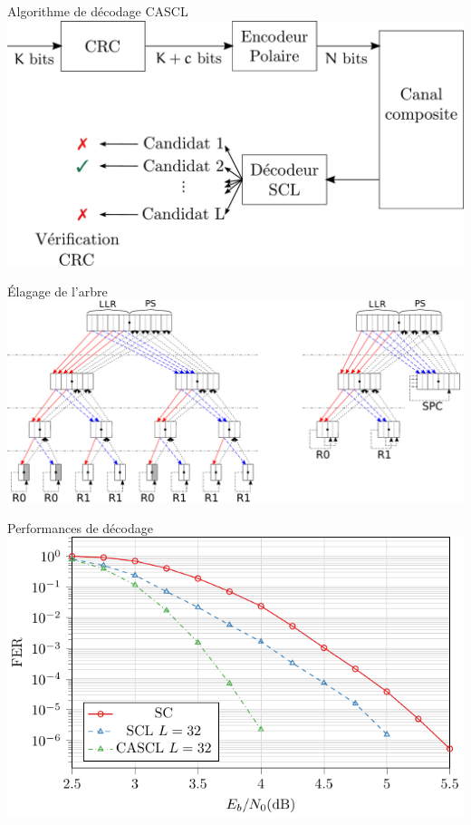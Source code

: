 \documentclass[t,compress,mathserif,12pt,xcolor=dvipsnames]{beamer}
\begin{document}
\begin{frame}[c]{Algorithme de décodage CASCL}
			\includegraphics[width=\textwidth]{./fig/cascl}
\end{frame}

\begin{frame}[c]{\'Elagage de l'arbre}
			\includegraphics[width=\textwidth]{./fig/pruning}
\end{frame}


\begin{frame}[c]{Performances de décodage}
			\includegraphics[width=\textwidth]{./fig/scl_L/tikz/source}
\end{frame}
\end{document}
